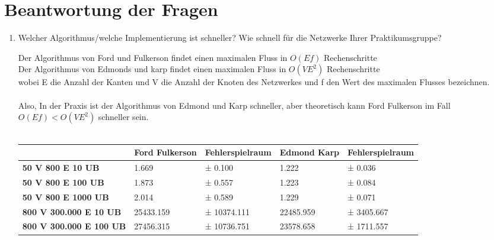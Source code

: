 \documentclass[a4paper]{article}
\begin{document}
\section{Beantwortung der Fragen}
\begin{enumerate}\bfseries
	\item Welcher Algorithmus/welche Implementierung ist schneller? Wie schnell für die Netzwerke Ihrer Praktikumsgruppe?
		\begin{answer}
			Der Algorithmus von Ford und Fulkerson findet einen maximalen Fluss in $O(Ef)$ Rechenschritte \\
			Der Algorithmus von Edmonds und karp findet einen maximalen Fluss in $O(VE^2)$ Rechenschritte \\
			wobei E die Anzahl der Kanten und V die Anzahl der Knoten des Netzwerkes und f den Wert des maximalen Flusses bezeichnen. \\
			\\
			Also, In der Praxis ist der Algorithmus von Edmond und Karp schneller, aber theoretisch kann Ford Fulkerson im Fall $O(Ef) < O(VE^2)$ schneller sein.
			\\
			\\
			\begin{adjustbox}{width=.949\textwidth}
				\begin{tabular}{|l|l|l|l|l|}
					\hline
													   & \textbf{Ford Fulkerson} & \textbf{Fehlerspielraum} & \textbf{Edmond Karp} & \textbf{Fehlerspielraum} \raisebox{-3mm}{\rule[8mm]{20mm}{0mm} }\\ \hline
					\textbf{50 V 800 E 10 UB}          & 1.669                   & ± 0.100                  & 1.222                & ± 0.036                  \raisebox{-3mm}{\rule[8mm]{20mm}{0mm} }\\ \hline
					\textbf{50 V 800 E 100 UB}         & 1.873                   & ± 0.557                  & 1.223                & ± 0.084                  \raisebox{-3mm}{\rule[8mm]{20mm}{0mm} }\\ \hline
					\textbf{50 V 800 E 1000 UB}        & 2.014                   & ± 0.589                  & 1.229                & ± 0.071                  \raisebox{-3mm}{\rule[8mm]{20mm}{0mm} }\\ \hline
					\textbf{800 V 300.000 E 10 UB}     & 25433.159               & ± 10374.111              & 22485.959            & ± 3405.667               \raisebox{-3mm}{\rule[8mm]{20mm}{0mm} }\\ \hline
					\textbf{800 V 300.000 E 100 UB}    & 27456.315               & ± 10736.751              & 23578.658            & ± 1711.557               \raisebox{-3mm}{\rule[8mm]{20mm}{0mm} }\\ \hline

\end{tabular}
\end{adjustbox}
\end{answer}
\end{enumerate}
\end{document}
